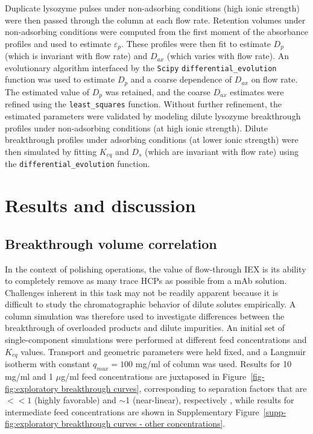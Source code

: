 \documentclass[preprint,review,12pt]{elsarticle}
\begin{document}
        Duplicate lysozyme pulses under non-adsorbing conditions (high ionic strength) were then passed through the column at each flow rate. Retention volumes under non-adsorbing conditions were computed from the first moment of the absorbance profiles and used to estimate $\varepsilon_p$. These profiles were then fit to estimate $D_p$ (which is invariant with flow rate) and $D_{ax}$ (which varies with flow rate). An evolutionary algorithm interfaced by the \texttt{Scipy} \texttt{differential\_evolution} function was used to estimate $D_p$ and a coarse dependence of $D_{ax}$ on flow rate. The estimated value of $D_p$ was retained, and the coarse $D_{ax}$ estimates were refined using the \texttt{least\_squares} function. Without further refinement, the estimated parameters were validated by modeling dilute lysozyme breakthrough profiles under non-adsorbing conditions (at high ionic strength). Dilute breakthrough profiles under adsorbing conditions (at lower ionic strength) were then simulated by fitting $K_{eq}$ and $D_s$ (which are invariant with flow rate) using the \texttt{differential\_evolution} function.


\section{Results and discussion} \label{sec:results}
    \subsection{Breakthrough volume correlation} \label{ssec:break vol corr}
        In the context of polishing operations, the value of flow-through IEX is its ability to completely remove as many trace HCPs as possible from a mAb solution. Challenges inherent in this task may not be readily apparent because it is difficult to study the chromatographic behavior of dilute solutes empirically. A column simulation was therefore used to investigate differences between the breakthrough of overloaded products and dilute impurities. An initial set of single-component simulations were performed at different feed concentrations and $K_{eq}$ values. Transport and geometric parameters were held fixed, and a Langmuir isotherm with constant $q_{max} = 100$ mg/ml of column was used. Results for 10 mg/ml and 1 $\mu$g/ml feed concentrations are juxtaposed in Figure~\ref{fig-fig:exploratory breakthrough curves}, corresponding to separation factors that are $<< 1$ (highly favorable) and $\sim$1 (near-linear), respectively \cite{perrys}, while results for intermediate feed concentrations are shown in Supplementary Figure~\ref{supp-fig:exploratory breakthrough curves - other concentrations}.
\end{document}
